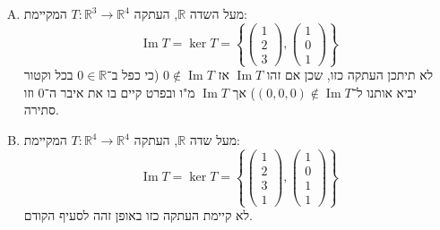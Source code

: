 \documentclass[]{article}
\newcommand\R     {\mathbb{R}}
\DeclareMathOperator\Img   {Im}
\newcommand\co        {\colon}
\newcommand\pms[1]    {\begin{pmatrix}
		#1
\end{pmatrix}}
\newcommand\ccb[1]    {\left \{ #1 \right \}}
\begin{document}
\begin{enumerate}[A)]
		
		
	
	\item מעל השדה $\R$, העתקה $T \co \R^3 \to \R^4$ המקיימת: 
	\[ \Img T = \ker T = \ccb{\pms{1 \\ 2 \\ 3}, \pms{1 \\ 0 \\ 1}} \]
	לא תיתכן העתקה כזו, שכן אם זהו $\Img T$ אז $0 \notin \Img T$ (כי כפל ב־$0 \in \R$ בכל וקטור יביא אותנו ל־$(0, 0, 0) \notin \Img T$) אך $\Img T$ מ"ו ובפרט קיים בו את איבר ה־0 וזו סתירה. 
	\item מעל שדה $\R$, העתקה $T \co \R^4 \to \R^4$ המקיימת: 
	\[ \Img T = \ker T = \ccb{\pms{1 \\ 2 \\ 3 \\ 1}, \pms{1 \\ 0 \\ 1 \\ 1}} \]
	לא קיימת העתקה כזו באופן זהה לסעיף הקודם. 
	\end{enumerate}
	
\end{document}

